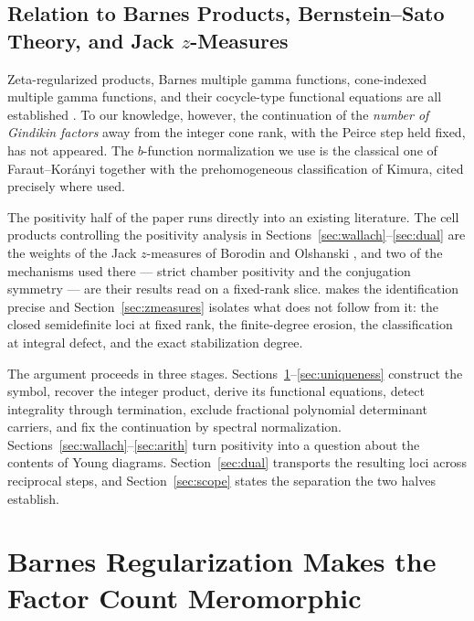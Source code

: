 \documentclass[11pt,letterpaper]{article}
\begin{document}
\subsection{Relation to Barnes Products, Bernstein--Sato Theory,
  and Jack \texorpdfstring{$z$}{z}-Measures}

Zeta-regularized products, Barnes multiple gamma functions, cone-indexed
multiple gamma functions, and their cocycle-type functional equations are all
established \cite{Barnes,FR,TW,Winding,PerezMarco}. To our knowledge, however,
the continuation of the \emph{number of Gindikin factors} away from the integer
cone rank, with the Peirce step held fixed, has not appeared. The $b$-function
normalization we use is the classical one of Faraut--Kor\'anyi together with the
prehomogeneous classification of Kimura, cited precisely where used.

The positivity half of the paper runs directly into an existing literature. The cell
products controlling the positivity analysis in Sections~\ref{sec:wallach}--\ref{sec:dual} are the weights of the Jack
$z$-measures of Borodin and Olshanski \cite{BO}, and two of the mechanisms used
there --- strict chamber positivity and the conjugation symmetry --- are their
results read on a fixed-rank slice.  makes the identification
precise and Section~\ref{sec:zmeasures} isolates what does not follow from it:
the closed semidefinite loci at fixed rank, the finite-degree erosion, the
classification at integral defect, and the exact stabilization degree.

The argument proceeds in three stages. Sections~\ref{sec:norm}--\ref{sec:uniqueness}
construct the symbol, recover the integer product, derive its functional
equations, detect integrality through termination, exclude fractional polynomial
determinant carriers, and fix the continuation by spectral normalization.
Sections~\ref{sec:wallach}--\ref{sec:arith} turn positivity into a question about
the contents of Young diagrams. Section~\ref{sec:dual} transports the resulting
loci across reciprocal steps, and Section~\ref{sec:scope} states the separation
the two halves establish.

\begin{center}
\end{center}
\esrule

\section{Barnes Regularization Makes the Factor Count Meromorphic}
\label{sec:norm}
\end{document}
